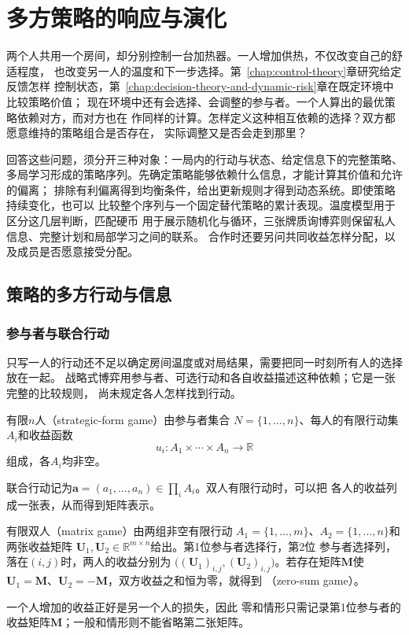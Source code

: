 \chapter{多方策略的响应与演化}
\label{chap:game-theory-and-multi-agent-decision}

两个人共用一个房间，却分别控制一台加热器。一人增加供热，不仅改变自己的舒适程度，
也改变另一人的温度和下一步选择。第~\ref{chap:control-theory}章研究给定反馈怎样
控制状态，第~\ref{chap:decision-theory-and-dynamic-risk}章在既定环境中比较策略价值；
现在环境中还有会选择、会调整的参与者。一个人算出的最优策略依赖对方，而对方也在
作同样的计算。怎样定义这种相互依赖的选择？双方都愿意维持的策略组合是否存在，
实际调整又是否会走到那里？

回答这些问题，须分开三种对象：一局内的行动与状态、给定信息下的完整策略、
多局学习形成的策略序列。先确定策略能够依赖什么信息，才能计算其价值和允许的偏离；
排除有利偏离得到均衡条件，给出更新规则才得到动态系统。即使策略持续变化，也可以
比较整个序列与一个固定替代策略的累计表现。温度模型用于区分这几层判断，匹配硬币
用于展示随机化与循环，三张牌质询博弈则保留私人信息、完整计划和局部学习之间的联系。
合作时还要另问共同收益怎样分配，以及成员是否愿意接受分配。

\section{策略的多方行动与信息}
\label{sec:game-actions-information}

\subsection{参与者与联合行动}
\label{sec:game-joint-actions}

只写一人的行动还不足以确定房间温度或对局结果，需要把同一时刻所有人的选择放在一起。
战略式博弈用参与者、可选行动和各自收益描述这种依赖；它是一张完整的比较规则，
尚未规定各人怎样找到行动。

\begin{definition}[有限战略式博弈]
\label{def:game-finite-strategic-game}
有限\(n\)人（strategic-form game）由参与者集合
\(N=\{1,\ldots,n\}\)、每人的有限行动集\(A_i\)和收益函数
\[
  u_i:A_1\times\cdots\times A_n\to\mathbb{R}
\]
组成，各$A_i$均非空。
\end{definition}

联合行动记为\(\bm a=(a_1,\ldots,a_n)\in\prod_i A_i\)。双人有限行动时，可以把
各人的收益列成一张表，从而得到矩阵表示。
\begin{definition}[有限矩阵博弈]
\label{def:game-finite-matrix-game}
有限双人（matrix game）由两组非空有限行动
\(A_1=\{1,\ldots,m\}\)、\(A_2=\{1,\ldots,n\}\)和两张收益矩阵
\(\bm{U}_1,\bm{U}_2\in\mathbb{R}^{m\times n}\)给出。第1位参与者选择行，第2位
参与者选择列，落在\((i,j)\)时，两人的收益分别为
\(\bigl((\bm{U}_1)_{i,j},(\bm{U}_2)_{i,j}\bigr)\)。若存在矩阵\(\bm{M}\)使
\(\bm{U}_1=\bm{M}\)、\(\bm{U}_2=-\bm{M}\)，双方收益之和恒为零，就得到
（zero-sum game）。
\end{definition}
一个人增加的收益正好是另一个人的损失，因此
零和情形只需记录第1位参与者的收益矩阵\(\bm{M}\)；一般和情形则不能省略第二张矩阵。

